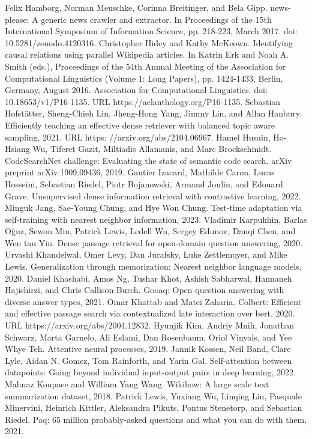Felix Hamborg, Norman Meuschke, Corinna Breitinger, and Bela Gipp. news-please: A generic news crawler and extractor. In Proceedings of the 15th International Symposium of Information Science, pp. 218-223, March 2017. doi: 10.5281/zenodo.4120316.
Christopher Hidey and Kathy McKeown. Identifying causal relations using parallel Wikipedia articles. In Katrin Erk and Noah A. Smith (eds.), Proceedings of the 54th Annual Meeting of the Association for Computational Linguistics (Volume 1: Long Papers), pp. 1424-1433, Berlin, Germany, August 2016. Association for Computational Linguistics. doi: 10.18653/v1/P16-1135. URL https://aclanthology.org/P16-1135.
Sebastian Hofstätter, Sheng-Chieh Lin, Jheng-Hong Yang, Jimmy Lin, and Allan Hanbury. Efficiently teaching an effective dense retriever with balanced topic aware sampling, 2021. URL https: //arxiv.org/abs/2104.06967.
Hamel Husain, Ho-Hsiang Wu, Tiferet Gazit, Miltiadis Allamanis, and Marc Brockschmidt. CodeSearchNet challenge: Evaluating the state of semantic code search. arXiv preprint arXiv:1909.09436, 2019.
Gautier Izacard, Mathilde Caron, Lucas Hosseini, Sebastian Riedel, Piotr Bojanowski, Armand Joulin, and Edouard Grave. Unsupervised dense information retrieval with contrastive learning, 2022.
Minguk Jang, Sae-Young Chung, and Hye Won Chung. Test-time adaptation via self-training with nearest neighbor information, 2023.
Vladimir Karpukhin, Barlas Oğuz, Sewon Min, Patrick Lewis, Ledell Wu, Sergey Edunov, Danqi Chen, and Wen tau Yin. Dense passage retrieval for open-domain question answering, 2020.
Urvashi Khandelwal, Omer Levy, Dan Jurafsky, Luke Zettlemoyer, and Mike Lewis. Generalization through memorization: Nearest neighbor language models, 2020.
Daniel Khashabi, Amos Ng, Tushar Khot, Ashish Sabharwal, Hannaneh Hajishirzi, and Chris Callison-Burch. Gooaq: Open question answering with diverse answer types, 2021.
Omar Khattab and Matei Zaharia. Colbert: Efficient and effective passage search via contextualized late interaction over bert, 2020. URL https://arxiv.org/abs/2004.12832.
Hyunjik Kim, Andriy Mnih, Jonathan Schwarz, Marta Garnelo, Ali Eslami, Dan Rosenbaum, Oriol Vinyals, and Yee Whye Teh. Attentive neural processes, 2019.
Jannik Kossen, Neil Band, Clare Lyle, Aidan N. Gomez, Tom Rainforth, and Yarin Gal. Self-attention between datapoints: Going beyond individual input-output pairs in deep learning, 2022.
Mahnaz Koupaee and William Yang Wang. Wikihow: A large scale text summarization dataset, 2018.
Patrick Lewis, Yuxiang Wu, Linqing Liu, Pasquale Minervini, Heinrich Kittler, Aleksandra Pikuts, Pontus Stenetorp, and Sebastian Riedel. Paq: 65 million probably-asked questions and what you can do with them, 2021.

